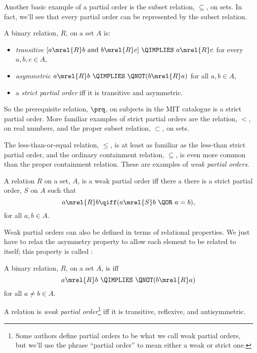 Another basic example of a partial order is the subset relation,
$\subseteq$, on sets.  In fact, we'll see that every partial order can be
represented by the subset relation.

\begin{definition}
A binary relation, $R$, on a set $A$ is:
\begin{itemize}

\item \emph{transitive} \qiff 
$[a \mrel{R}  b \text{ and } b \mrel{R}  c]\ \QIMPLIES\  a \mrel{R}  c$
\quad for every $a,b,c\in A$,

\item \emph{asymmetric} \qiff
$a \mrel{R}  b\  \QIMPLIES\  \QNOT(b \mrel{R}  a)$
\quad for all $a,b\in A$,

\item a \emph{strict partial order} iff it is transitive and asymmetric.
\end{itemize}

\end{definition}

So the prerequisite relation, $\prq$, on subjects in the MIT catalogue is
a strict partial order.  More familiar examples of strict partial orders
are the relation, $<$, on real numbers, and the proper subset relation,
$\subset$, on sets.
\fi

The less-than-or-equal relation, $\leq$, is at least as familiar as
the less-than strict partial order, and the ordinary containment
relation, $\subseteq$, is even more common than the proper containment
relation.  These are examples of \emph{weak partial orders}.
\begin{definition}
A relation $R$ on a set, $A$, is a weak partial order iff there a
there is a strict partial order, $S$ on $A$ such that
\[
a \mrel{R} b \qiff (a \mrel{S} b\ \QOR\ a = b),
\]
for all $a,b \in A$.
\end{definition}
Weak partial orders can also be defined in terms of relational
properties.  We just have to relax the asymmetry property to allow
each element to be related to itself; this property is called
:

\begin{definition}\label{antis}
A binary relation, $R$, on a set $A$, is  iff
\[
a \mrel{R}  b\ \QIMPLIES\ \QNOT(b \mrel{R}  a)
\]
for all $a \neq b \in A$.

A relation is \emph{weak partial order}\footnote{Some authors define
  partial orders to be what we call weak partial orders, but we'll use
  the phrase ``partial order'' to mean either a weak or strict one.}
iff it is transitive, reflexive, and antisymmetric.
\end{definition}

